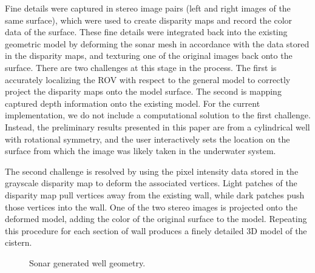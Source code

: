 \documentclass{llncs}
\begin{document}
Fine details were captured in stereo image pairs (left and right images of the same surface), which were used to create disparity maps and record the color data of the surface.
These fine details were integrated back into the existing geometric model by deforming the sonar mesh in accordance with the data stored in the disparity maps, and texturing one of the original images back onto the surface.
There are two challenges at this stage in the process. The first is accurately localizing the ROV with respect to the general model to correctly project the disparity maps onto the model surface. The second is mapping captured depth information onto the existing model.
For the current implementation, we do not include a computational solution to the first challenge. 
Instead, the preliminary results presented in this paper are from a cylindrical well with rotational symmetry, and the user interactively sets the location on the surface from which the image was likely taken in the underwater system.

The second challenge is resolved by using the pixel intensity data stored in the grayscale disparity map to deform the associated vertices.
Light patches of the disparity map pull vertices away from the existing wall, while dark patches push those vertices into the wall.
One of the two stereo images is projected onto the deformed model, adding the color of the original surface to the model. Repeating this procedure for each section of wall produces a finely detailed 3D model of the cistern.
%
\vspace{-10pt}
\begin{figure}[!h]
	\centering
		\quad %
		\caption{Sonar generated well geometry.}
		\label{fig:wellNoFine}
\end{figure}
%
\vspace{-25pt}
\end{document}
